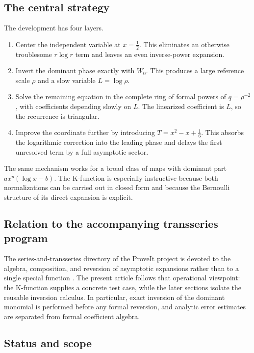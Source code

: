\documentclass[11pt,a4paper]{article}
\numberwithin{equation}{section}
\theoremstyle{remark}
\begin{document}
\subsection{The central strategy}

The development has four layers.

\begin{enumerate}
\item Center the independent variable at \(x=\tfrac12\).  This eliminates an
otherwise troublesome \(r\log r\) term and leaves an even inverse-power
expansion.
\item Invert the dominant phase exactly with \(W_0\).  This produces a large
reference scale \(\rho\) and a slow variable \(L=\log\rho\).
\item Solve the remaining equation in the complete ring of formal powers of
\(q=\rho^{-2}\), with coefficients depending slowly on \(L\).  The linearized
coefficient is \(L\), so the recurrence is triangular.
\item Improve the coordinate further by introducing
\(T=x^2-x+\tfrac16\).  This absorbs the logarithmic correction into the
leading phase and delays the first unresolved term by a full asymptotic
sector.
\end{enumerate}

The same mechanism works for a broad class of maps with dominant part
\(a x^p(\log x-b)\).  The K-function is especially instructive because both
normalizations can be carried out in closed form and because the Bernoulli
structure of its direct expansion is explicit.

\subsection{Relation to the accompanying transseries program}

The series-and-transseries directory of the ProveIt project is devoted to the
algebra, composition, and reversion of asymptotic expansions rather than to a
single special function \cite{ProveItSeries}.  The present article follows
that operational viewpoint: the K-function supplies a concrete test case,
while the later sections isolate the reusable inversion calculus.  In
particular, exact inversion of the dominant monomial is performed before any
formal reversion, and analytic error estimates are separated from formal
coefficient algebra.

\subsection{Status and scope}
\end{document}
